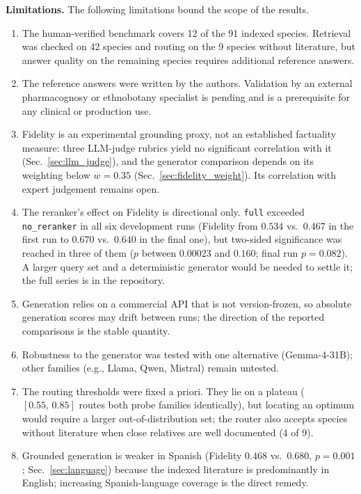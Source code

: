 \documentclass[runningheads]{llncs}
\begin{document}
\textbf{Limitations.} The following limitations bound the scope of the results.
\begin{enumerate}[label=(\roman*),ref=\roman*,leftmargin=*,itemsep=1pt,topsep=2pt]
  \item \label{lim:scope} The human-verified benchmark covers 12 of the 91 indexed species. Retrieval was checked on 42 species and routing on the 9 species without literature, but answer quality on the remaining species requires additional reference answers.
  \item \label{lim:references} The reference answers were written by the authors. Validation by an external pharmacognosy or ethnobotany specialist is pending and is a prerequisite for any clinical or production use.
  \item \label{lim:fidelity} Fidelity is an experimental grounding proxy, not an established factuality measure: three LLM-judge rubrics yield no significant correlation with it (Sec.~\ref{sec:llm_judge}), and the generator comparison depends on its weighting below $w{=}0.35$ (Sec.~\ref{sec:fidelity_weight}). Its correlation with expert judgement remains open.
  \item \label{lim:reranker} The reranker's effect on Fidelity is directional only. \texttt{full} exceeded \texttt{no\_reranker} in all six development runs (Fidelity from $0.534$ vs.\ $0.467$ in the first run to $0.670$ vs.\ $0.640$ in the final one), but two-sided significance was reached in three of them ($p$ between $0.00023$ and $0.160$; final run $p{=}0.082$). A larger query set and a deterministic generator would be needed to settle it; the full series is in the repository.
  \item \label{lim:api} Generation relies on a commercial API that is not version-frozen, so absolute generation scores may drift between runs; the direction of the reported comparisons is the stable quantity.
  \item \label{lim:generators} Robustness to the generator was tested with one alternative (Gemma-4-31B); other families (e.g., Llama, Qwen, Mistral) remain untested.
  \item \label{lim:thresholds} The routing thresholds were fixed a priori. They lie on a plateau ($[0.55,\,0.85]$ routes both probe families identically), but locating an optimum would require a larger out-of-distribution set; the router also accepts species without literature when close relatives are well documented (4 of 9).
  \item \label{lim:language} Grounded generation is weaker in Spanish (Fidelity $0.468$ vs.\ $0.680$, $p{=}0.001$; Sec.~\ref{sec:language}) because the indexed literature is predominantly in English; increasing Spanish-language coverage is the direct remedy.

\end{enumerate}
\end{document}
